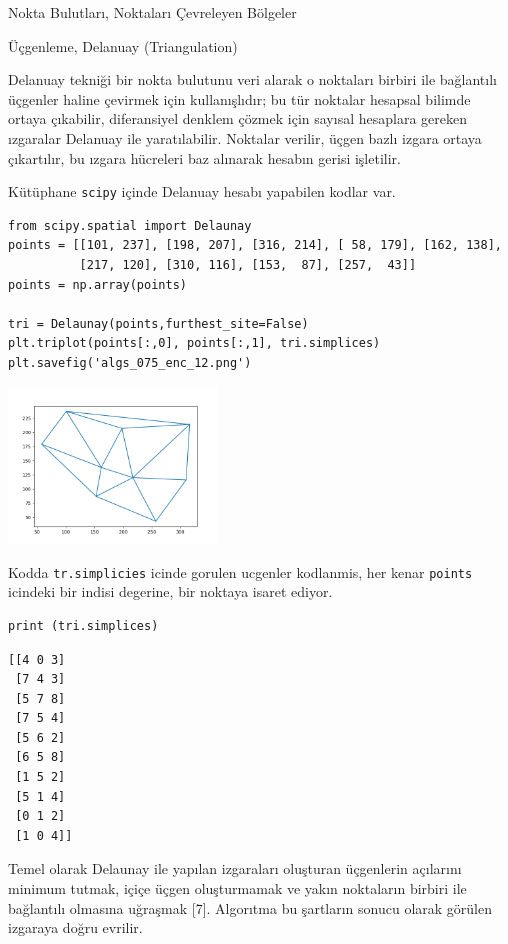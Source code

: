 \documentclass[12pt,fleqn]{article}\usepackage{../../common}
\begin{document}
Nokta Bulutları, Noktaları Çevreleyen Bölgeler

Üçgenleme, Delanuay (Triangulation)

Delanuay tekniği bir nokta bulutunu veri alarak o noktaları birbiri ile
bağlantılı üçgenler haline çevirmek için kullanışlıdır; bu tür noktalar hesapsal
bilimde ortaya çıkabilir, diferansiyel denklem çözmek için sayısal hesaplara
gereken ızgaralar Delanuay ile yaratılabilir. Noktalar verilir, üçgen bazlı
izgara ortaya çıkartılır, bu ızgara hücreleri baz alınarak hesabın gerisi
işletilir.

Kütüphane \verb!scipy! içinde Delanuay hesabı yapabilen kodlar var.

\begin{verbatim}
from scipy.spatial import Delaunay
points = [[101, 237], [198, 207], [316, 214], [ 58, 179], [162, 138], 
          [217, 120], [310, 116], [153,  87], [257,  43]]
points = np.array(points)

tri = Delaunay(points,furthest_site=False)
plt.triplot(points[:,0], points[:,1], tri.simplices)
plt.savefig('algs_075_enc_12.png')
\end{verbatim}

\includegraphics[width=15em]{algs_075_enc_12.png}

Kodda \verb!tr.simplicies! icinde gorulen ucgenler kodlanmis, her kenar
\verb!points! icindeki bir indisi degerine, bir noktaya isaret ediyor.

\begin{verbatim}
print (tri.simplices)
\end{verbatim}

\begin{verbatim}
[[4 0 3]
 [7 4 3]
 [5 7 8]
 [7 5 4]
 [5 6 2]
 [6 5 8]
 [1 5 2]
 [5 1 4]
 [0 1 2]
 [1 0 4]]
\end{verbatim}

Temel olarak Delaunay ile yapılan izgaraları oluşturan üçgenlerin açılarını
minimum tutmak, içiçe üçgen oluşturmamak ve yakın noktaların birbiri ile
bağlantılı olmasına uğraşmak [7]. Algorıtma bu şartların sonucu olarak görülen
izgaraya doğru evrilir.
\end{document}
